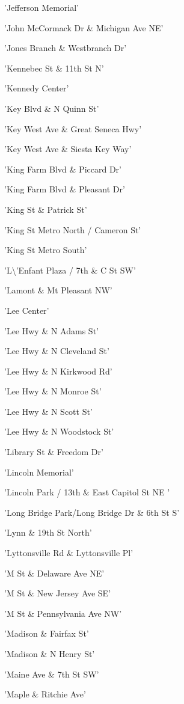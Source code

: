 \documentclass[11pt]{article}
\begin{document}
\begin{enumerate*}
\item 'Jefferson Memorial'
\item 'John McCormack Dr \& Michigan Ave NE'
\item 'Jones Branch \& Westbranch Dr'
\item 'Kennebec St \& 11th St N'
\item 'Kennedy Center'
\item 'Key Blvd \& N Quinn St'
\item 'Key West Ave \& Great Seneca Hwy'
\item 'Key West Ave \& Siesta Key Way'
\item 'King Farm Blvd \& Piccard Dr'
\item 'King Farm Blvd \& Pleasant Dr'
\item 'King St \& Patrick St'
\item 'King St Metro North / Cameron St'
\item 'King St Metro South'
\item 'L\textbackslash{}'Enfant Plaza / 7th \& C St SW'
\item 'Lamont \& Mt Pleasant NW'
\item 'Lee Center'
\item 'Lee Hwy \& N Adams St'
\item 'Lee Hwy \& N Cleveland St'
\item 'Lee Hwy \& N Kirkwood Rd'
\item 'Lee Hwy \& N Monroe St'
\item 'Lee Hwy \& N Scott St'
\item 'Lee Hwy \& N Woodstock St'
\item 'Library St \& Freedom Dr'
\item 'Lincoln Memorial'
\item 'Lincoln Park / 13th \& East Capitol St NE '
\item 'Long Bridge Park/Long Bridge Dr \& 6th St S'
\item 'Lynn \& 19th St North'
\item 'Lyttonsville Rd \& Lyttonsville Pl'
\item 'M St \& Delaware Ave NE'
\item 'M St \& New Jersey Ave SE'
\item 'M St \& Pennsylvania Ave NW'
\item 'Madison \& Fairfax St'
\item 'Madison \& N Henry St'
\item 'Maine Ave \& 7th St SW'
\item 'Maple \& Ritchie Ave'

\end{enumerate*}
\end{document}
